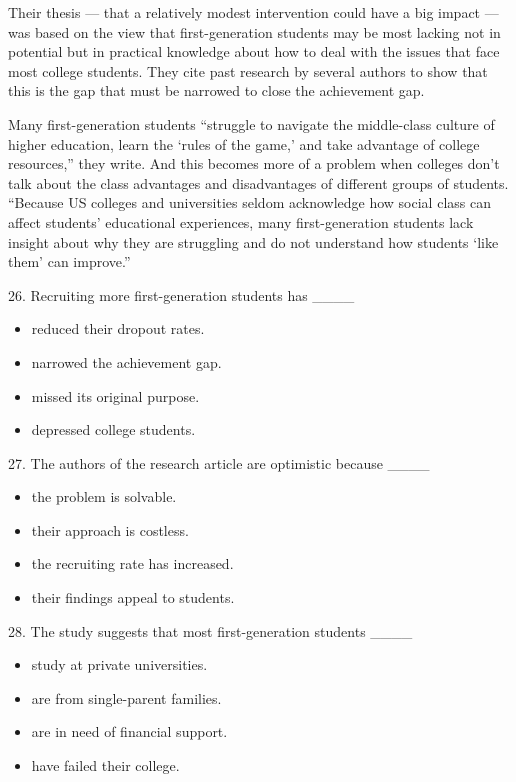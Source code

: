 \documentclass[UTF8,11pt]{ctexart}
\begin{document}
Their thesis — that a relatively modest intervention could have a big impact — was based on the view that first-generation students may be most lacking not in potential but in practical knowledge about how to deal with the issues that face most college students. They cite past research by several authors to show that this is the gap that must be narrowed to close the achievement gap.


Many first-generation students “struggle to navigate the middle-class culture of higher education, learn the ‘rules of the game,’ and take advantage of college resources,” they write. And this becomes more of a problem when colleges don’t talk about the class advantages and disadvantages of different groups of students. “Because US colleges and universities seldom acknowledge how social class can affect students’ educational experiences, many first-generation students lack insight about why they are struggling and do not understand how students ‘like them’ can improve.”


26. Recruiting more first-generation students has \_\_\_\_


\begin{itemize}[leftmargin=2em,itemsep=.2em,topsep=.4em]\item[A.] reduced their dropout rates.
\item[B.] narrowed the achievement gap.
\item[C.] missed its original purpose.
\item[D.] depressed college students.
\end{itemize}

27. The authors of the research article are optimistic because \_\_\_\_


\begin{itemize}[leftmargin=2em,itemsep=.2em,topsep=.4em]\item[A.] the problem is solvable.
\item[B.] their approach is costless.
\item[C.] the recruiting rate has increased.
\item[D.] their findings appeal to students.
\end{itemize}

28. The study suggests that most first-generation students \_\_\_\_


\begin{itemize}[leftmargin=2em,itemsep=.2em,topsep=.4em]\item[A.] study at private universities.
\item[B.] are from single-parent families.
\item[C.] are in need of financial support.
\item[D.] have failed their college.
\end{itemize}
\end{document}
